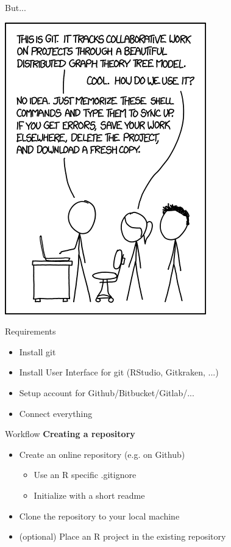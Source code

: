 \documentclass[xcolor=table]{beamer}\usepackage[]{graphicx}\usepackage[]{color}
\begin{document}
\begin{frame}{But...}
\begin{center}
\includegraphics[height=.75\textheight]{git_no_idea.png}
\end{center}
\end{frame}

\begin{frame}{Requirements}
\begin{itemize}
  \item Install git 
  \item Install User Interface for git (RStudio, Gitkraken, ...)
  \item Setup account for Github/Bitbucket/Gitlab/...
  \item Connect everything
\end{itemize}
\end{frame}

\begin{frame}{Workflow}
\textbf{Creating a repository}
\begin{itemize}
  \item Create an online repository (e.g. on Github)
  \begin{itemize}
    \item Use an R specific .gitignore
    \item Initialize with a short readme
  \end{itemize}
  \item Clone the repository to your local machine
  \item (optional) Place an R project in the existing repository
\end{itemize}
\end{frame}
\end{document}
